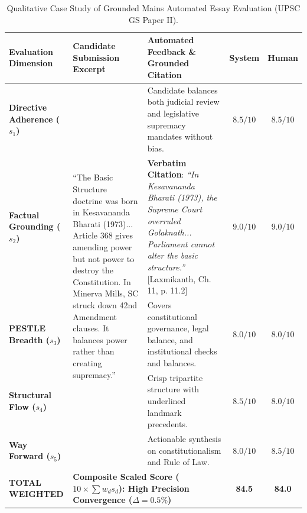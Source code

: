 \documentclass[conference]{IEEEtran}
\begin{document}
\begin{table}[t]
\centering
\caption{Qualitative Case Study of Grounded Mains Automated Essay Evaluation (UPSC GS Paper II).}
\label{tab:case_study}
\small
\begin{tabularx}{\textwidth}{p{3.5cm}Xp{5.5cm}cc}
\toprule
\textbf{Evaluation Dimension} & \textbf{Candidate Submission Excerpt} & \textbf{Automated Feedback \& Grounded Citation} & \textbf{System} & \textbf{Human} \\
\midrule
\textbf{Directive Adherence ($s_1$)} & \multirow{5}{=}{``The Basic Structure doctrine was born in Kesavananda Bharati (1973)... Article 368 gives amending power but not power to destroy the Constitution. In Minerva Mills, SC struck down 42nd Amendment clauses. It balances power rather than creating supremacy.''} & Candidate balances both judicial review and legislative supremacy mandates without bias. & $8.5 / 10$ & $8.5 / 10$ \\
\textbf{Factual Grounding ($s_2$)} & & \textbf{Verbatim Citation}: \textit{``In Kesavananda Bharati (1973), the Supreme Court overruled Golaknath... Parliament cannot alter the basic structure.''} [Laxmikanth, Ch. 11, p. 11.2] & $9.0 / 10$ & $9.0 / 10$ \\
\textbf{PESTLE Breadth ($s_3$)} & & Covers constitutional governance, legal balance, and institutional checks and balances. & $8.0 / 10$ & $8.0 / 10$ \\
\textbf{Structural Flow ($s_4$)} & & Crisp tripartite structure with underlined landmark precedents. & $8.5 / 10$ & $8.0 / 10$ \\
\textbf{Way Forward ($s_5$)} & & Actionable synthesis on constitutionalism and Rule of Law. & $8.0 / 10$ & $8.5 / 10$ \\
\midrule
\textbf{TOTAL WEIGHTED} & \multicolumn{2}{l}{\textbf{Composite Scaled Score ($10 \times \sum w_d s_d$): High Precision Convergence ($\Delta = 0.5\%$)}} & \textbf{84.5} & \textbf{84.0} \\
\bottomrule
\end{tabularx}
\end{table}
\end{document}
